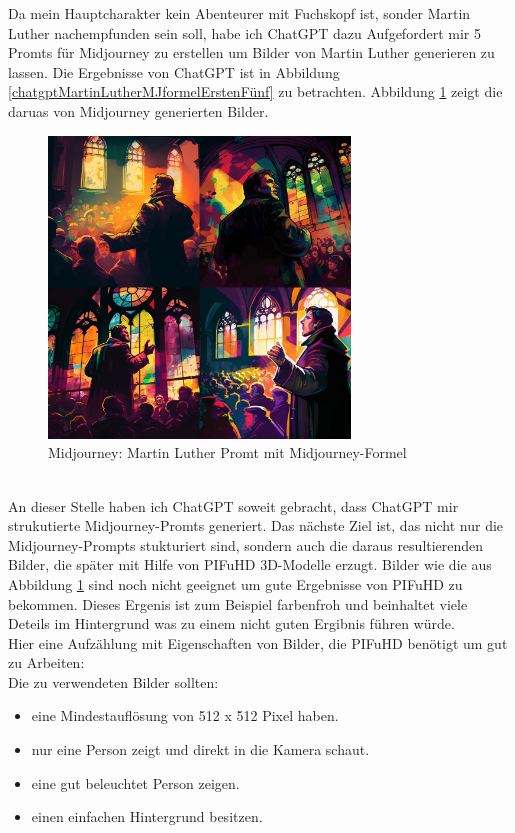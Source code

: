 Da mein Hauptcharakter kein Abenteurer mit Fuchskopf ist, sonder Martin Luther nachempfunden sein soll, habe ich ChatGPT dazu Aufgefordert mir 5 Promts für Midjourney zu erstellen um Bilder von Martin Luther generieren zu lassen. Die Ergebnisse von ChatGPT ist in Abbildung \ref{chatgptMartinLutherMJformelErstenFünf} zu betrachten. Abbildung \ref{MidJourneyMLMitFormel} zeigt die daruas von Midjourney generierten Bilder.
\begin{figure}
	\centering
	\includegraphics[width=8.022cm]{BilderFuerBA/MidJourneyMLMitFormel.png}
	\caption{Midjourney: Martin Luther Promt mit Midjourney-Formel}
	\label{MidJourneyMLMitFormel}
\end{figure}
\\
An dieser Stelle haben ich ChatGPT soweit gebracht, dass ChatGPT mir strukutierte Midjourney-Promts generiert. Das nächste Ziel ist, das nicht nur die Midjourney-Prompts stukturiert sind, sondern auch die daraus resultierenden Bilder, die später mit Hilfe von PIFuHD 3D-Modelle erzugt. Bilder wie die aus Abbildung  \ref{MidJourneyMLMitFormel} sind noch nicht geeignet um gute Ergebnisse von PIFuHD zu bekommen. Dieses Ergenis ist zum Beispiel farbenfroh und beinhaltet viele Deteils im Hintergrund was zu einem nicht guten Ergibnis führen würde.
\\
Hier eine Aufzählung mit Eigenschaften von Bilder, die PIFuHD benötigt um gut zu Arbeiten:
\\
Die zu verwendeten Bilder sollten:
\begin{itemize}
	\item eine Mindestauflösung von 512 x 512 Pixel haben.
	\item nur eine Person zeigt und direkt in die Kamera schaut.
	\item eine gut beleuchtet Person zeigen.
	\item einen einfachen Hintergrund besitzen.
\end{itemize}
